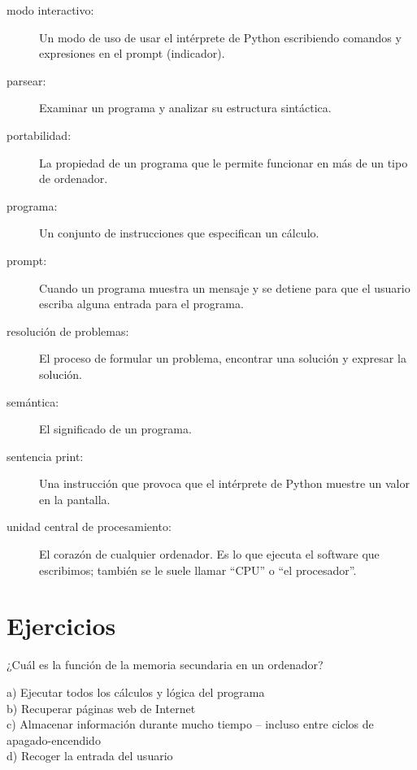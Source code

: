 \begin{description}
\item[modo interactivo:] Un modo de uso de usar el intérprete de Python
escribiendo comandos y expresiones en el prompt (indicador).

\item[parsear:] Examinar un programa y analizar su estructura sintáctica.

\item[portabilidad:]  La propiedad de un programa que le permite funcionar en más
de un tipo de ordenador.

\item[programa:] Un conjunto de instrucciones que especifican un cálculo.

\item[prompt:] Cuando un programa muestra un mensaje y se detiene para que
el usuario escriba alguna entrada para el programa.

\item[resolución de problemas:]  El proceso de formular un problema, encontrar
una solución y expresar la solución.

\item[semántica:] El significado de un programa.

\item[sentencia print:]  Una instrucción que provoca que el intérprete de Python
muestre un valor en la pantalla.

\item[unidad central de procesamiento:] El corazón de cualquier ordenador. Es lo que
ejecuta el software que escribimos; también se le suele llamar ``CPU'' o ``el procesador''.

\end{description}

\section{Ejercicios}


\begin{ex}
¿Cuál es la función de la memoria secundaria en un ordenador?

a) Ejecutar todos los cálculos y lógica del programa\\
b) Recuperar páginas web de Internet\\
c) Almacenar información durante mucho tiempo -- incluso entre ciclos de apagado-encendido\\
d) Recoger la entrada del usuario
\end{ex}

